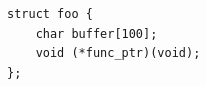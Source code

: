 \documentclass[tikz]{standalone}
\begin{document}
\begin{lrbox}{\heapOverflowInObjCode}
\begin{lstlisting}
struct foo {
    char buffer[100];
    void (*func_ptr)(void);
};
\end{lstlisting}
\end{lrbox}


\end{document}
